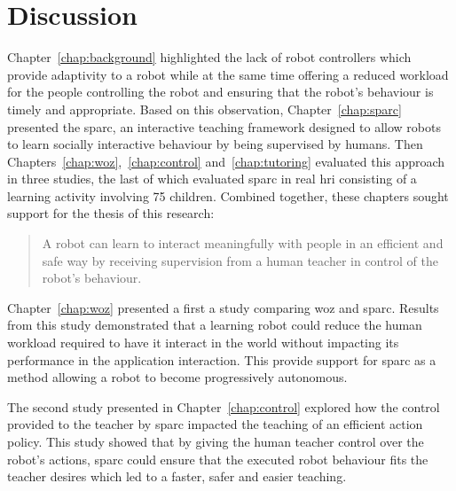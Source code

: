 \chapter{Discussion} \label{chap:discussion}
\glsresetall

Chapter~\ref{chap:background} highlighted the lack of robot controllers which provide adaptivity to a robot while at the same time offering a reduced workload for the people controlling the robot and ensuring that the robot's behaviour is timely and appropriate. Based on this observation, Chapter~\ref{chap:sparc} presented the \gls{sparc}, an interactive teaching framework designed to allow robots to learn socially interactive behaviour by being supervised by humans. Then Chapters~\ref{chap:woz},~\ref{chap:control} and~\ref{chap:tutoring} evaluated this approach in three studies, the last of which evaluated \gls{sparc} in real \gls{hri} consisting of a learning activity involving 75 children. Combined together, these chapters sought support for the thesis of this research:

\begin{quote}
	A robot can learn to interact meaningfully with people in an efficient and safe way by receiving supervision from a human teacher in control of the robot's behaviour.
\end{quote}

Chapter~\ref{chap:woz} presented a first a study comparing \gls{woz} and \gls{sparc}. Results from this study demonstrated that a learning robot could reduce the human workload required to have it interact in the world without impacting its performance in the application interaction. This provide support for \gls{sparc} as a method allowing a robot to become progressively autonomous. 

The second study presented in Chapter~\ref{chap:control} explored how the control provided to the teacher by \gls{sparc} impacted the teaching of an efficient action policy. This study showed that by giving the human teacher control over the robot's actions, \gls{sparc} could ensure that the executed robot behaviour fits the teacher desires which led to a faster, safer and easier teaching. 

